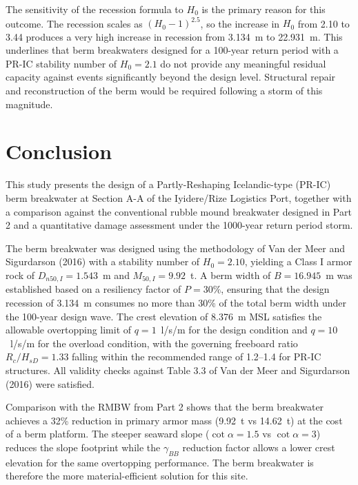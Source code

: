 \documentclass[a4paper, 11pt]{article}
\begin{document}
The sensitivity of the recession formula to $H_0$ is the primary reason for this outcome. The recession scales as $(H_0 - 1)^{2.5}$, so the increase in $H_0$ from 2.10 to 3.44 produces a very high increase in recession from 3.134~m to 22.931~m. This underlines that berm breakwaters designed for a 100-year return period with a PR-IC stability number of $H_0 = 2.1$ do not provide any meaningful residual capacity against events significantly beyond the design level. Structural repair and reconstruction of the berm would be required following a storm of this magnitude.
\newpage
\section{Conclusion}
\hspace{0.5cm}This study presents the design of a Partly-Reshaping Icelandic-type (PR-IC) berm breakwater at Section A-A of the Iyidere/Rize Logistics Port, together with a comparison against the conventional rubble mound breakwater designed in Part 2 and a quantitative damage assessment under the 1000-year return period storm.

The berm breakwater was designed using the methodology of Van der Meer and Sigurdarson (2016) with a stability number of $H_0 = 2.10$, yielding a Class I armor rock of $D_{n50,I} = 1.543$~m and $M_{50,I} = 9.92$~t. A berm width of $B = 16.945$~m was established based on a resiliency factor of $P = 30\%$, ensuring that the design recession of 3.134~m consumes no more than 30\% of the total berm width under the 100-year design wave. The crest elevation of 8.376~m MSL satisfies the allowable overtopping limit of $q = 1$~l/s/m for the design condition and $q = 10$~l/s/m for the overload condition, with the governing freeboard ratio $R_c/H_{sD} = 1.33$ falling within the recommended range of 1.2--1.4 for PR-IC structures. All validity checks against Table 3.3 of Van der Meer and Sigurdarson (2016) were satisfied.

Comparison with the RMBW from Part 2 shows that the berm breakwater achieves a 32\% reduction in primary armor mass (9.92~t vs 14.62~t) at the cost of a berm platform. The steeper seaward slope ($\cot\alpha = 1.5$ vs $\cot\alpha = 3$) reduces the slope footprint while the $\gamma_{BB}$ reduction factor allows a lower crest elevation for the same overtopping performance. The berm breakwater is therefore the more material-efficient solution for this site.
\end{document}
